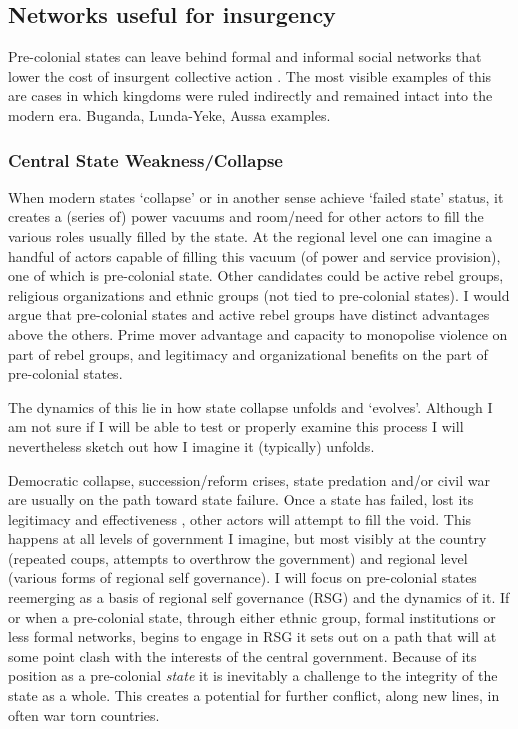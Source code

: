 \documentclass[12pt]{article}
\begin{document}
\subsection{Networks useful for insurgency}

Pre-colonial states can leave behind formal and informal social networks that
lower the cost of insurgent collective action \citep{Wig2016, Wood2000}. The
most visible examples of this are cases in which kingdoms were ruled indirectly
and remained intact into the modern era. Buganda, Lunda-Yeke, Aussa examples.

\subsubsection{Central State Weakness/Collapse}

When modern states `collapse' or in another sense achieve `failed state' status,
it creates a (series of) power vacuums and room/need for other actors to fill
the various roles usually filled by the state. At the regional level one can
imagine a handful of actors capable of filling this vacuum (of power and
service provision), one of which is pre-colonial state. Other candidates could
be active rebel groups, religious organizations and ethnic groups (not tied to
pre-colonial states). I would argue that pre-colonial states and active rebel
groups have distinct advantages above the others. Prime mover advantage and
capacity to monopolise violence on part of rebel groups, and legitimacy and
organizational benefits on the part of pre-colonial states.

The dynamics of this lie in how state collapse unfolds and `evolves'. Although I
am not sure if I will be able to test or properly examine this process I will
nevertheless sketch out how I imagine it (typically) unfolds.

Democratic collapse, succession/reform crises, state predation and/or civil war
are usually on the path toward state failure\citep{Goldstone_2008}. Once a state
has failed, lost its legitimacy and effectiveness \citep{Goldstone_2008}, other
actors will attempt to fill the void. This happens at all levels of government I
imagine, but most visibly at the country (repeated coups, attempts to overthrow
the government) and regional level (various forms of regional self governance).
I will focus on pre-colonial states reemerging as a basis of regional self
governance  (RSG) and the dynamics of it. If or when a pre-colonial state,
through either ethnic group, formal institutions or less formal networks, begins
to engage in RSG it sets out on a path that will at some point clash with the
interests of the central government. Because of its position as a pre-colonial
\textit{state} it is inevitably a challenge to the integrity of the state as a
whole. This creates a potential for further conflict, along new lines, in often
war torn countries. 
\end{document}
